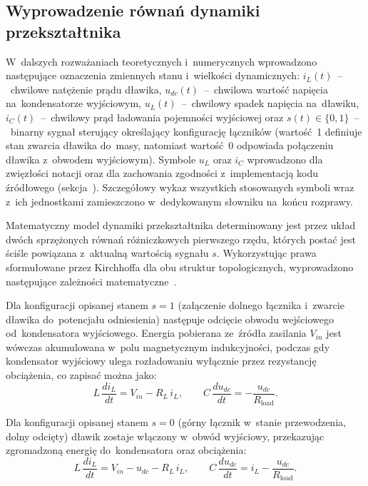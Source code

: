 \subsection{Wyprowadzenie równań dynamiki przekształtnika}
\label{subsec:rownania-stanu}

W~dalszych rozważaniach teoretycznych i~numerycznych wprowadzono następujące oznaczenia zmiennych stanu i~wielkości dynamicznych: $i_L(t)$~--~chwilowe natężenie prądu dławika, $u_{dc}(t)$~--~chwilowa wartość napięcia na~kondensatorze wyjściowym, $u_L(t)$~--~chwilowy spadek napięcia na~dławiku, $i_C(t)$~--~chwilowy prąd ładowania pojemności wyjściowej oraz $s(t)\in\{0,1\}$~--~binarny sygnał sterujący określający konfigurację łączników (wartość~1 definiuje stan zwarcia dławika do~masy, natomiast wartość~0 odpowiada połączeniu dławika z~obwodem wyjściowym). Symbole $u_L$ oraz $i_C$ wprowadzono dla zwięzłości notacji oraz dla zachowania zgodności z~implementacją kodu źródłowego (sekcja~). Szczegółowy wykaz wszystkich stosowanych symboli wraz z~ich jednostkami zamieszczono w~dedykowanym słowniku na~końcu rozprawy.

Matematyczny model dynamiki przekształtnika determinowany jest przez układ dwóch sprzężonych równań różniczkowych pierwszego rzędu, których postać jest ściśle powiązana z~aktualną wartością sygnału $s$. Wykorzystując prawa sformułowane przez Kirchhoffa dla obu struktur topologicznych, wyprowadzono następujące zależności matematyczne~\cite{erickson2020}.

Dla konfiguracji opisanej stanem \textbf{$s=1$} (załączenie dolnego łącznika i~zwarcie dławika do~potencjału odniesienia) następuje odcięcie obwodu wejściowego od~kondensatora wyjściowego. Energia pobierana ze~źródła zasilania $V_{in}$ jest wówczas akumulowana w~polu magnetycznym indukcyjności, podczas gdy kondensator wyjściowy ulega rozładowaniu wyłącznie przez rezystancję obciążenia, co zapisać można jako:
\begin{equation}
    L\,\frac{di_L}{dt} = V_{in} - R_L\,i_L, \qquad C\,\frac{du_{dc}}{dt} = -\frac{u_{dc}}{R_{\mathrm{load}}}.
    \label{eq:state-s1}
\end{equation}

Dla konfiguracji opisanej stanem \textbf{$s=0$} (górny łącznik w~stanie przewodzenia, dolny odcięty) dławik zostaje włączony w~obwód wyjściowy, przekazując zgromadzoną energię do~kondensatora oraz obciążenia:
\begin{equation}
    L\,\frac{di_L}{dt} = V_{in} - u_{dc} - R_L\,i_L, \qquad C\,\frac{du_{dc}}{dt} = i_L - \frac{u_{dc}}{R_{\mathrm{load}}}.
    \label{eq:state-s0}
\end{equation}

